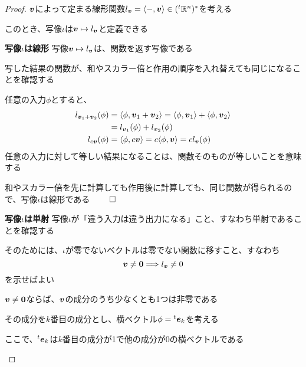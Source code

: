 \documentclass[../../../topic_linear-algebra]{subfiles}
\begin{document}
\begin{proof}
  $\vb*{v}$によって定まる線形関数$l_{\vb*{v}} = \langle -, \vb*{v} \rangle \in ({}^t\mathbb{R}^n)^*$を考える

  このとき、写像$\iota$は$\vb*{v} \mapsto l_{\vb*{v}}$と定義できる

  \begin{subpattern}{\bfseries 写像$\iota$は線形}
    写像$\vb*{v} \mapsto l_{\vb*{v}}$は、関数を返す写像である

    写した結果の関数が、和やスカラー倍と作用の順序を入れ替えても同じになることを確認する

    \br

    任意の入力$\phi$とすると、
    \begin{align*}
      l_{\vb*{v}_1 + \vb*{v}_2}(\phi) & = \langle \phi, \vb*{v}_1 + \vb*{v}_2 \rangle = \langle \phi, \vb*{v}_1 \rangle + \langle \phi, \vb*{v}_2 \rangle \\
                                      & = l_{\vb*{v}_1}(\phi) + l_{\vb*{v}_2}(\phi)                                                                       \\
      l_{c \vb*{v}}(\phi)             & = \langle \phi, c \vb*{v} \rangle = c \langle \phi, \vb*{v} \rangle = c l_{\vb*{v}}(\phi)
    \end{align*}
    任意の入力に対して等しい結果になることは、関数そのものが等しいことを意味する

    和やスカラー倍を先に計算しても作用後に計算しても、同じ関数が得られるので、写像$\iota$は線形である $\qed$
  \end{subpattern}

  \begin{subpattern}{\bfseries 写像$\iota$は単射}
    写像$\iota$が「違う入力は違う出力になる」こと、すなわち単射であることを確認する

    そのためには、$\iota$が零でないベクトルは零でない関数に移すこと、すなわち
    \begin{equation*}
      \vb*{v} \neq \vb*{0} \Longrightarrow l_{\vb*{v}} \neq 0
    \end{equation*}
    を示せばよい

    \br

    $\vb*{v} \neq \vb*{0}$ならば、$\vb*{v}$の成分のうち少なくとも1つは非零である

    その成分を$k$番目の成分とし、横ベクトル$\phi = {}^t\vb*{e}_k$を考える

    ここで、${}^t\vb*{e}_k$は$k$番目の成分が1で他の成分が0の横ベクトルである


\end{subpattern}
\end{proof}
\end{document}
